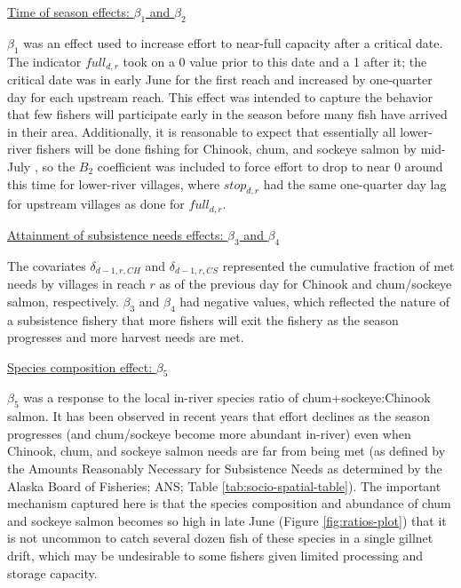 \documentclass[12pt,]{book}
\theoremstyle{definition}
\theoremstyle{definition}
\theoremstyle{definition}
\theoremstyle{remark}
\begin{document}
\noindent
\underline{Time of season effects: $\beta_1$ and $\beta_2$}

\noindent
\(\beta_1\) was an effect used to increase effort to near-full capacity
after a critical date. The indicator \(full_{d,r}\) took on a 0 value
prior to this date and a 1 after it; the critical date was in early June
for the first reach and increased by one-quarter day for each upstream
reach. This effect was intended to capture the behavior that few fishers
will participate early in the season before many fish have arrived in
their area. Additionally, it is reasonable to expect that essentially
all lower-river fishers will be done fishing for Chinook, chum, and
sockeye salmon by mid-July \citep{hamazaki-2008}, so the \(B_2\)
coefficient was included to force effort to drop to near 0 around this
time for lower-river villages, where \(stop_{d,r}\) had the same
one-quarter day lag for upstream villages as done for \(full_{d,r}\).

\noindent
\underline{Attainment of subsistence needs effects: $\beta_3$ and $\beta_4$}

\noindent
The covariates \(\delta_{d-1,r,CH}\) and \(\delta_{d-1,r,CS}\)
represented the cumulative fraction of met needs by villages in reach
\(r\) as of the previous day for Chinook and chum/sockeye salmon,
respectively. \(\beta_3\) and \(\beta_4\) had negative values, which
reflected the nature of a subsistence fishery that more fishers will
exit the fishery as the season progresses and more harvest needs are
met.

\noindent
\underline{Species composition effect: $\beta_5$}

\noindent
\(\beta_5\) was a response to the local in-river species ratio of
chum+sockeye:Chinook salmon. It has been observed in recent years that
effort declines as the season progresses (and chum/sockeye become more
abundant in-river) even when Chinook, chum, and sockeye salmon needs are
far from being met (as defined by the Amounts Reasonably Necessary for
Subsistence Needs as determined by the Alaska Board of Fisheries; ANS;
Table \ref{tab:socio-spatial-table}). The important mechanism captured
here is that the species composition and abundance of chum and sockeye
salmon becomes so high in late June (Figure \ref{fig:ratios-plot}) that
it is not uncommon to catch several dozen fish of these species in a
single gillnet drift, which may be undesirable to some fishers given
limited processing and storage capacity.
\end{document}
